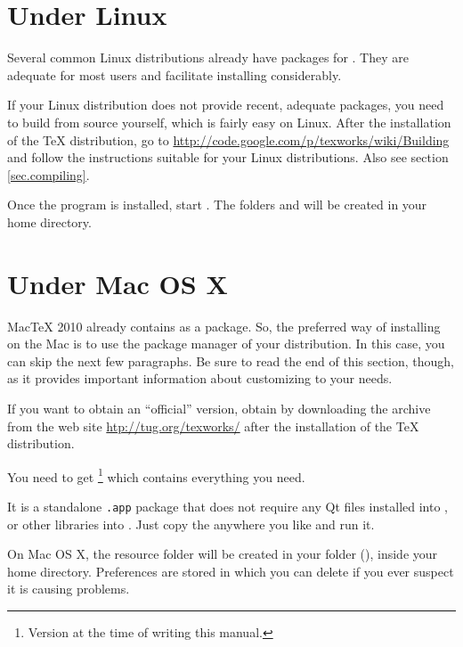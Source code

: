 \section{Under Linux}

Several common Linux distributions already have packages for {\Tw}. They are adequate for most users and facilitate installing {\Tw} considerably.

If your Linux distribution does not provide recent, adequate packages, you need to build {\Tw} from source yourself, which is fairly easy on Linux. After the installation of the {\TeX} distribution, go to \url{http://code.google.com/p/texworks/wiki/Building} and follow the instructions suitable for your Linux distributions. Also see section \ref{sec.compiling}.

Once the program is installed, start {\Tw}. The folders  and  will be created in your home directory.

\section{Under Mac OS X}

MacTeX 2010 already contains {\Tw} as a package. So, the preferred way of installing {\Tw} on the Mac is to use the package manager of your distribution. In this case, you can skip the next few paragraphs. Be sure to read the end of this section, though, as it provides important information about customizing {\Tw} to your needs.

If you want to obtain an ``official'' version, obtain {\Tw} by downloading the archive from the {\Tw} web site \url{htp://tug.org/texworks/} after the installation of the {\TeX} distribution.

You need to get \footnote{Version at the time of writing this manual.} which contains everything you need.

It is a standalone \texttt{.app} package that does not require any Qt files installed into , or other libraries into . Just copy the  anywhere you like and run it.

On Mac OS X, the {\Tw} resource folder will be created in your  folder (), inside your home directory. Preferences are stored in 
which you can delete if you ever suspect it is causing problems.

